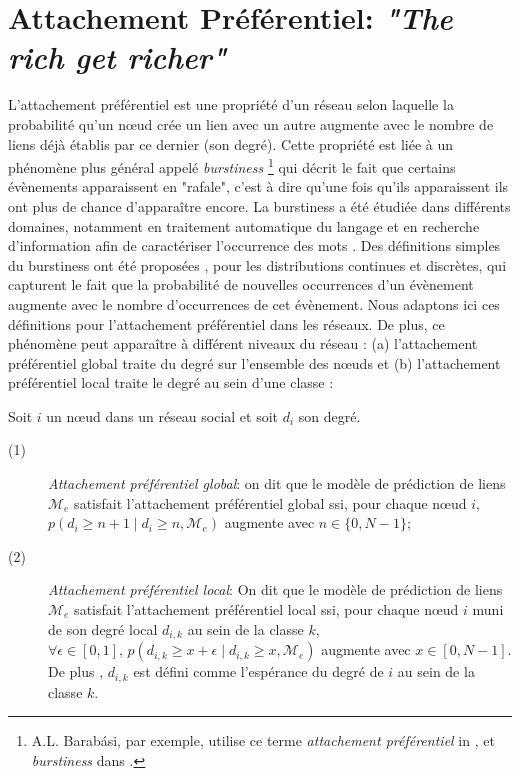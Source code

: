 \documentclass[french]{hermes-journal}
\newcommand{\pr}{p}
\begin{document}
\section{Attachement Préférentiel: \emph{"The rich get richer"}}
\label{sec:burstiness}


L'attachement préférentiel est une propriété d'un réseau selon laquelle la probabilité qu'un n\oe{}ud crée un lien avec un autre augmente avec le nombre de liens déjà établis par ce dernier (son degré). Cette propriété est liée à un phénomène plus général appelé \textit{burstiness} \footnote{A.L. Barab\'asi, par exemple, utilise ce terme \textit{attachement préférentiel} in \cite{barabasi1999emergence}, et \textit{burstiness} dans \cite{barabasi_burst}.} qui décrit le fait que certains évènements apparaissent en "rafale", c'est à dire qu'une fois qu'ils apparaissent ils ont plus de chance d'apparaître encore. La burstiness a été étudiée dans différents domaines, notamment en traitement automatique du langage et en recherche d'information afin de caractériser l'occurrence des mots \cite{church1995poisson}. Des définitions simples du burstiness ont été proposées \cite{clinchant2008bnb,clinchant2010information}, pour les distributions continues et discrètes, qui capturent le fait que la probabilité de nouvelles occurrences d'un évènement augmente avec le nombre d'occurrences de cet évènement. Nous adaptons ici ces définitions pour l'attachement préférentiel dans les réseaux. De plus, ce phénomène peut apparaître à différent niveaux du réseau : (a) l'attachement préférentiel global traite du degré sur l'ensemble des n\oe{}uds et (b) l'attachement préférentiel local traite le degré au sein d'une classe :


\begin{definition}
Soit $i$ un n\oe{}ud dans un réseau social et soit $d_i$ son degré.
\begin{description}
    \item[(1)] \emph{Attachement préférentiel global}: on dit que le modèle de prédiction de liens $\mathcal{M}_e$ satisfait l'attachement préférentiel global ssi, pour chaque n\oe{}ud $i$, $\pr(d_i \ge n+1 \mid d_i \ge n, \mathcal{M}_e)$ augmente avec $n \in \{0, N-1\}$;
 \item[(2)] \emph{Attachement préférentiel local}: On dit que le modèle de prédiction de liens  $\mathcal{M}_e$ satisfait l'attachement préférentiel local ssi, pour chaque n\oe{}ud $i$ muni de son degré local $d_{i,k}$  au sein de la classe $k$, $\forall \epsilon \in [0,1], \, \pr(d_{i,k} \ge x+\epsilon \mid d_{i,k} \ge x, \mathcal{M}_e)$  augmente avec $x \in [0,N-1]$. De plus , $d_{i,k}$ est défini comme l'espérance du degré de $i$ au sein de la classe $k$.
\end{description}
\label{def:burst-soc-net}
\end{definition}
\end{document}
